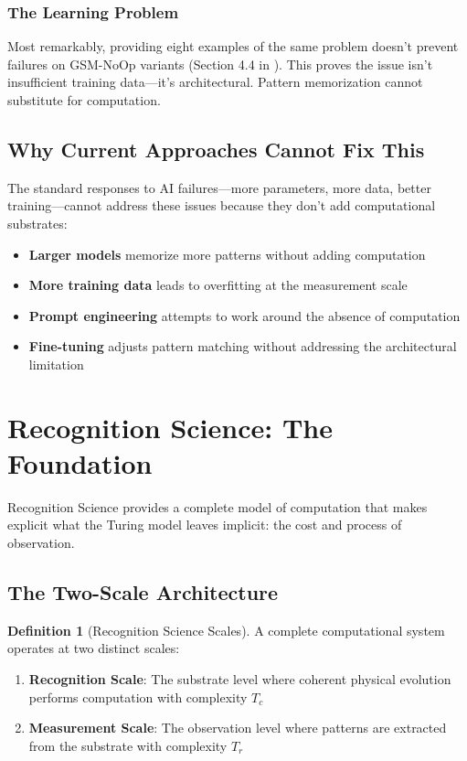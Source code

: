 \documentclass[11pt,letterpaper]{article}
\theoremstyle{plain}
\theoremstyle{definition}
\newtheorem{definition}[theorem]{Definition}
\theoremstyle{remark}
\begin{document}
\subsubsection{The Learning Problem}
Most remarkably, providing eight examples of the same problem doesn't prevent failures on GSM-NoOp variants (Section 4.4 in \cite{mirzadeh2024gsm}). This proves the issue isn't insufficient training data—it's architectural. Pattern memorization cannot substitute for computation.

\subsection{Why Current Approaches Cannot Fix This}

The standard responses to AI failures—more parameters, more data, better training—cannot address these issues because they don't add computational substrates:

\begin{itemize}
\item \textbf{Larger models} memorize more patterns without adding computation
\item \textbf{More training data} leads to overfitting at the measurement scale  
\item \textbf{Prompt engineering} attempts to work around the absence of computation
\item \textbf{Fine-tuning} adjusts pattern matching without addressing the architectural limitation
\end{itemize}

\section{Recognition Science: The Foundation}
\label{sec:theory}

Recognition Science provides a complete model of computation that makes explicit what the Turing model leaves implicit: the cost and process of observation.

\subsection{The Two-Scale Architecture}

\begin{definition}[Recognition Science Scales]
A complete computational system operates at two distinct scales:
\begin{enumerate}
\item \textbf{Recognition Scale}: The substrate level where coherent physical evolution performs computation with complexity $T_c$
\item \textbf{Measurement Scale}: The observation level where patterns are extracted from the substrate with complexity $T_r$  
\end{enumerate}
\end{definition}
\end{document}
